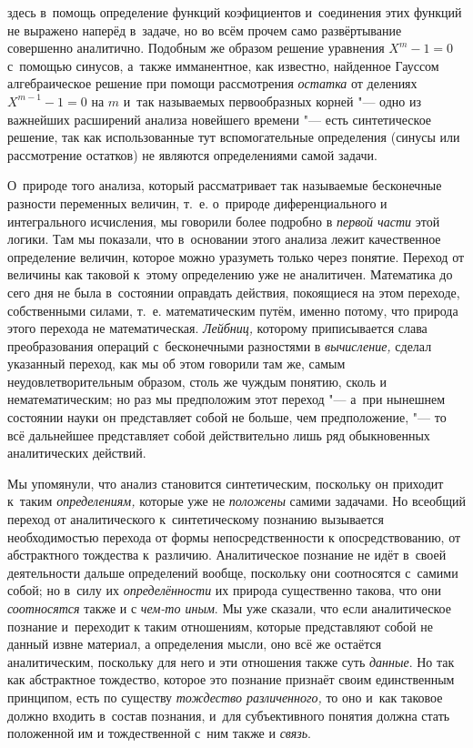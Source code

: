 здесь в~помощь определение функций коэфициентов и~соединения этих функций не
выражено наперёд в~задаче, но во всём прочем само развёртывание совершенно
аналитично. Подобным же образом решение уравнения $X^m-1=0$ с~помощью синусов,
а~также имманентное, как известно, найденное Гауссом алгебраическое
решение при помощи рассмотрения {\em остатка} от делениях $X^{m-1}-1=0$ на $m$
и~так называемых первообразных корней "--- одно из важнейших расширений анализа
новейшего времени "--- есть синтетическое решение, так как использованные тут
вспомогательные определения (синусы или рассмотрение остатков) не являются
определениями самой задачи.

О~природе того анализа, который рассматривает так называемые
бесконечные разности переменных величин, т.~е. о~природе диференциального и
интегрального исчисления, мы говорили более подробно в
{\em первой части} этой
логики. Там мы показали, что в~основании этого анализа лежит качественное
определение величин, которое можно уразуметь только через понятие. Переход
от величины как таковой к~этому определению уже не аналитичен. Математика
до сего дня не была в~состоянии оправдать действия, покоящиеся на этом
переходе, собственными силами, т.~е. математическим путём, именно потому,
что природа этого перехода не математическая.
{\em Лейбниц,} которому
приписывается слава преобразования операций с~бесконечными разностями в
{\em вычисление,} сделал
указанный переход, как мы об этом говорили там же, самым
неудовлетворительным образом, столь же чуждым понятию, сколь и
нематематическим; но раз мы предположим этот переход "--- а~при
нынешнем состоянии науки он представляет собой не больше, чем
предположение, "--- то всё дальнейшее представляет собой
действительно лишь ряд обыкновенных аналитических действий.

Мы упомянули, что анализ становится синтетическим, поскольку
он приходит к~таким {\em определениям,}
которые уже не
{\em положены} самими
задачами. Но всеобщий переход от аналитического к~синтетическому познанию
вызывается необходимостью перехода от формы непосредственности к
опосредствованию, от абстрактного тождества к~различию. Аналитическое
познание не идёт в~своей деятельности дальше определений вообще, поскольку
они соотносятся с~самими собой; но в~силу их
{\em определённости} их
природа существенно такова, что они
{\em соотносятся} также и
с {\em чем-то иным}.
Мы уже сказали, что если аналитическое познание и~переходит к
таким отношениям, которые представляют собой не данный извне материал, а
определения мысли, оно всё же остаётся аналитическим, поскольку для него и
эти отношения также суть {\em данные}.
Но так как абстрактное тождество, которое это познание
признаёт своим единственным принципом, есть по существу
{\em тождество различенного,}
то оно и~как таковое должно входить в~состав
познания, и~для субъективного понятия должна стать положенной им и
тождественной с~ним также и
{\em связь}.


